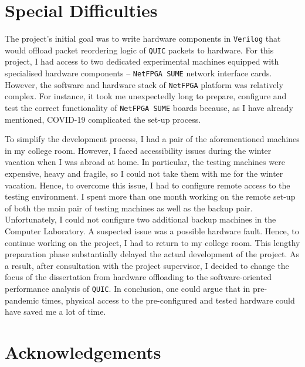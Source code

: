 \documentclass[12pt,a4paper,twoside,openright]{report}
\begin{document}
\section*{Special Difficulties}

The project's initial goal was to write hardware components in \texttt{Verilog} that would offload packet reordering logic of \texttt{QUIC} packets to hardware.
For this project, I had access to two dedicated experimental machines equipped with specialised hardware components -- \texttt{NetFPGA SUME} network interface cards.
However, the software and hardware stack of \texttt{NetFPGA} platform was relatively complex.
For instance, it took me unexpectedly long to prepare, configure and test the correct functionality of \texttt{NetFPGA SUME} boards because, as I have already mentioned, COVID-19 complicated the set-up process.

To simplify the development process, I had a pair of the aforementioned machines in my college room.
However, I faced accessibility issues during the winter vacation when I was abroad at home.
In particular, the testing machines were expensive, heavy and fragile, so I could not take them with me for the winter vacation.
Hence, to overcome this issue, I had to configure remote access to the testing environment.
I spent more than one month working on the remote set-up of both the main pair of testing machines as well as the backup pair.
Unfortunately, I could not configure two additional backup machines in the Computer Laboratory.
A suspected issue was a possible hardware fault.
Hence, to continue working on the project, I had to return to my college room.
This lengthy preparation phase substantially delayed the actual development of the project.
As a result, after consultation with the project supervisor, I decided to change the focus of the dissertation from hardware offloading to the software-oriented performance analysis of \texttt{QUIC}. 
In conclusion, one could argue that in pre-pandemic times, physical access to the pre-configured and tested hardware could have saved me a lot of time.






\tableofcontents

\listoffigures

\newpage
\section*{Acknowledgements}
\end{document}
